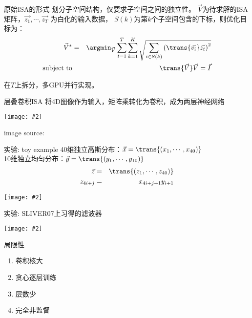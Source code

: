 \documentclass {beamer}
\newcommand{\addgraph}[2]{\begin{center}
\texttt{[image: \#2]}\end{center}}
\begin{document}
\begin{frame}{原始ISA的形式}
    划分子空间结构，仅要求子空间之间的独立性。
    $\vec{V}$为待求解的ISA矩阵，$\vec{z_1},\cdots,\vec{z_T}$
    为\alert{白化}的输入数据，
    $S(k)$为第$k$个子空间包含的下标，则优化目标为：
    \begin{eqnarray}
        \vec{V}^* &=& \argmin_{\vec{V}} \sum_{t=1}^T \sum_{k=1}^K
        \sqrt{\sum_{i\in S(k)}\left(\trans{\vec{v_i}}\vec{z_t}\right)^2}
        \nonumber \\
        \text{subject to} && \trans{\vec{V}}\vec{V}=\vec{I}
        \label{eqn:isa:1}
    \end{eqnarray}


     {
        \vspace{1em}
        在$T$上拆分，多GPU\alert{并行实现}。
    }
\end{frame}

\begin{frame}{层叠卷积ISA}
    将4D图像作为输入，矩阵乘转化为卷积，成为两层神经网络
    \addgraph{0.8}{res/isa-stack.png}
    {\tiny image source: \cite{wu2013unsupervised}}
\end{frame}

\begin{frame}{实验: toy example}
    40维独立高斯分布：$\vec{x}=\trans{(x_1,\cdots,x_{40})}$ \\
    10维独立均匀分布：$\vec{y}=\trans{(y_1, \cdots, y_{10})}$
    \begin{eqnarray}
        \vec{z} &=& \trans{(z_1, \cdots, z_{40})} \nonumber \\
        z_{4i+j} &=& x_{4i+j+1}y_{i+1}
    \end{eqnarray}
    \addgraph{0.8}{res/isa-toyeg.eps}
\end{frame}

\begin{frame}{实验: SLIVER07上习得的滤波器}
    \addgraph{0.9}{res/isa-filter.png}
\end{frame}

\begin{frame}{局限性}
    \begin{enumerate}
        \item 卷积核大
        \item 贪心逐层训练
        \item 层数少
        \item 完全非监督
    \end{enumerate}
\end{frame}
\end{document}

